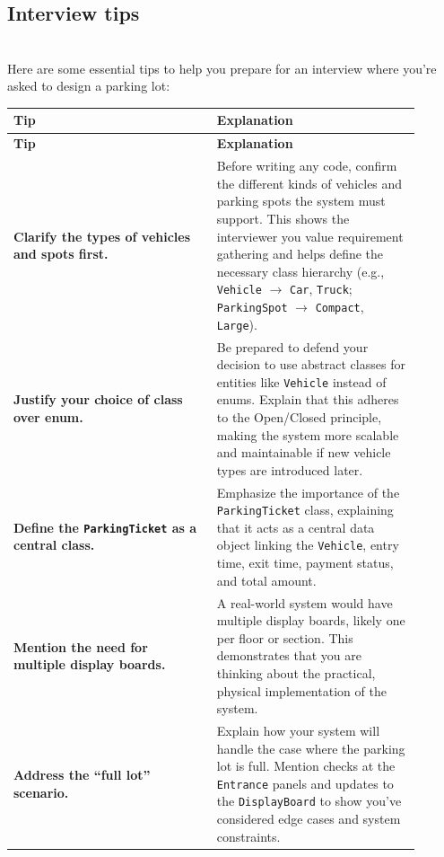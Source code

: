 \subsection{Interview tips}\label{GR1gPxd8ThX-062hRiPuy}
\\
Here are some essential tips to help you prepare for an interview where you're asked to design a parking lot:

\begin{center}
\renewcommand{\arraystretch}{1.5}

\begin{longtable}{|p{0.45\linewidth}|p{0.45\linewidth}|}
\hline
\textbf{Tip} & \textbf{Explanation} \\
\hline
\endfirsthead

\hline
\textbf{Tip} & \textbf{Explanation} \\
\hline
\endhead

\hline
\endfoot

\hline
\endlastfoot

\textbf{Clarify the types of vehicles and spots first.} &
Before writing any code, confirm the different kinds of vehicles and parking spots the system must support. This shows the interviewer you value requirement gathering and helps define the necessary class hierarchy (e.g., \texttt{Vehicle} $\rightarrow$ \texttt{Car}, \texttt{Truck}; \texttt{ParkingSpot} $\rightarrow$ \texttt{Compact}, \texttt{Large}). \\
\hline

\textbf{Justify your choice of class over enum.} &
Be prepared to defend your decision to use abstract classes for entities like \texttt{Vehicle} instead of enums. Explain that this adheres to the Open/Closed principle, making the system more scalable and maintainable if new vehicle types are introduced later. \\
\hline

\textbf{Define the \texttt{ParkingTicket} as a central class.} &
Emphasize the importance of the \texttt{ParkingTicket} class, explaining that it acts as a central data object linking the \texttt{Vehicle}, entry time, exit time, payment status, and total amount. \\
\hline

\textbf{Mention the need for multiple display boards.} &
A real-world system would have multiple display boards, likely one per floor or section. This demonstrates that you are thinking about the practical, physical implementation of the system. \\
\hline

\textbf{Address the ``full lot'' scenario.} &
Explain how your system will handle the case where the parking lot is full. Mention checks at the \texttt{Entrance} panels and updates to the \texttt{DisplayBoard} to show you've considered edge cases and system constraints. \\
\hline

\end{longtable}
\end{center}


